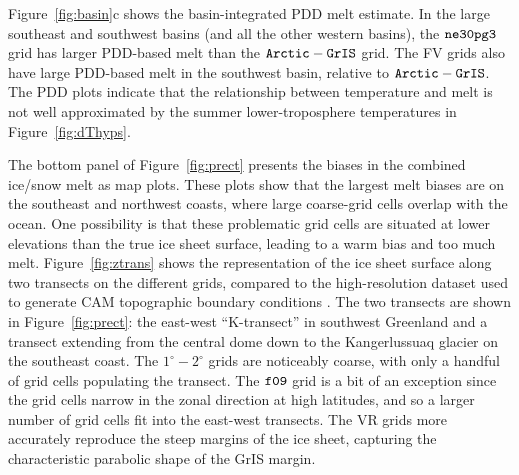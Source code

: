 \documentclass[draft]{agujournal2019}
\begin{document}
Figure~\ref{fig:basin}c shows the basin-integrated PDD melt estimate.  In the large southeast and southwest basins (and all the other western basins), the $\tt ne30pg3$ grid has larger PDD-based melt than the $\tt Arctic-GrIS$ grid. The FV grids also have large PDD-based melt in the southwest basin, relative to $\tt Arctic-GrIS$. The PDD plots indicate that the relationship between temperature and melt is not well approximated by the summer lower-troposphere temperatures in Figure~\ref{fig:dThyps}.

The bottom panel of Figure~\ref{fig:prect} presents the biases in the combined ice/snow melt as map plots. These plots show that the largest melt biases are on the southeast and northwest coasts, where large coarse-grid cells overlap with the ocean. One possibility is that these problematic grid cells are situated at lower elevations than the true ice sheet surface, leading to a warm bias and too much melt. Figure~\ref{fig:ztrans} shows the representation of the ice sheet surface along two transects on the different grids, compared to the high-resolution dataset used to generate CAM topographic boundary conditions \cite{GMTED2010,gmdd-8-4623-2015}. The two transects are shown in Figure~\ref{fig:prect}: the east-west ``K-transect'' in southwest Greenland and a transect extending from the central dome down to the  Kangerlussuaq glacier on the southeast coast. The $1^{\circ}-2^{\circ}$ grids are noticeably coarse, with only a handful of grid cells populating the transect. The $\tt f09$ grid is a bit of an exception since the grid cells narrow in the zonal direction at high latitudes, and so a larger number of grid cells fit into the east-west transects. The VR grids more accurately reproduce the steep margins of the ice sheet, capturing the characteristic parabolic shape of the GrIS margin.
\end{document}
